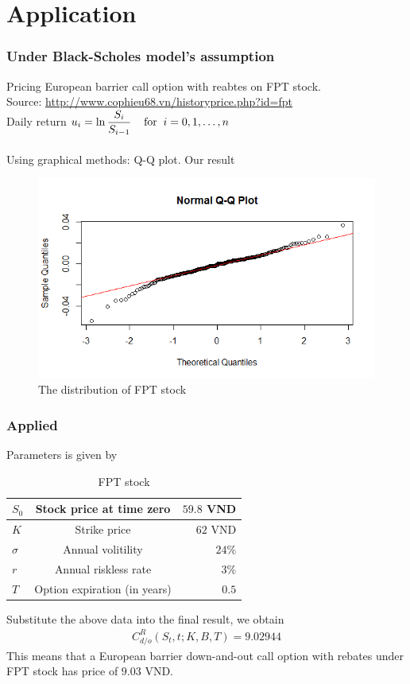 \documentclass{beamer}
\begin{document}
\section{Application}
\begin{frame}
\frametitle{Under Black-Scholes model's assumption}
Pricing European barrier call option with reabtes on FPT stock.\\
Source: \url{http://www.cophieu68.vn/historyprice.php?id=fpt}\\
Daily return $u_i=\ln\dfrac{S_i}{S_{i-1}} \hspace{0.4cm} \text{for}\hspace{0.2cm}i=0, 1, \dots, n$ \\ \pause
\fontsize{9pt}{10pt}\\[0.2cm]
Using graphical methods: Q-Q plot. Our result
\begin{figure}[htp]
	\begin{center}
		\includegraphics[scale=.4]{Rplot03}
	\end{center}
	\label{refRplot03}
	\caption{The distribution of FPT stock}
\end{figure}
\end{frame}
\begin{frame}
 \frametitle{Applied}
 Parameters is given by
 \begin{table}[!htp]
 	\centering
 	\begin{tabular}{|l|c|r|}
 		\hline
 		$S_0$ & Stock price at time zero   & $59.8$ VND\\
 		\hline
 		$K$ & Strike price  & $62$ VND\\
 		\hline
 		$\sigma$ &  Annual volitility & $24\%$\\
 		\hline
 		$r$ & Annual riskless rate  & $3\%$ \\
 		\hline
 		$T$ & Option expiration (in years)  & $0.5$\\
 		\hline	
 	\end{tabular}
 	\caption{FPT stock}
 \end{table} \pause
Substitute the above data into the final result, we obtain
\begin{align*}
C^R_{d/o}(S_t,t;K,B,T)=9.02944 
\end{align*}
This means that a European barrier down-and-out call option with rebates under FPT stock has price of $9.03$ VND.
\end{frame}
\end{document}
